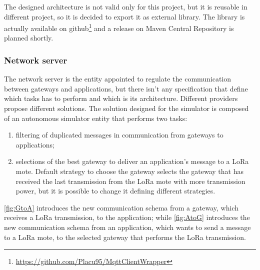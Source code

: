 \noindent The designed architecture is not valid only for this project, but it is reusable in different project, so it is decided to export it as external library. The library is actually available on github\footnote{\href{https://github.com/Placu95/MqttClientWrapper}{https://github.com/Placu95/MqttClientWrapper}} and a release on Maven Central Repository is planned shortly.

\subsubsection{Network server}
The network server is the entity appointed to regulate the communication between gateways and applications, but there isn't any specification that define which tasks has to perform and which is its architecture. 
Different providers propose different solutions. 
The solution designed for the simulator is composed of an autonomous simulator entity that performs two tasks:
\begin{enumerate}
    \item filtering of duplicated messages in communication from gateways to applications;
    \item selections of the best gateway to deliver an application's message to a LoRa mote. 
    Default strategy to choose the gateway selects the gateway that has received the last transmission from the LoRa mote with more transmission power, but it is possible to change it defining different strategies. 
\end{enumerate}
\autoref{fig:GtoA} introduces the new communication schema from a gateway, which receives a LoRa transmission, to the application; while \autoref{fig:AtoG} introduces the new communication schema from an application, which wants to send a message to a LoRa mote, to the selected gateway that performs the LoRa transmission.
